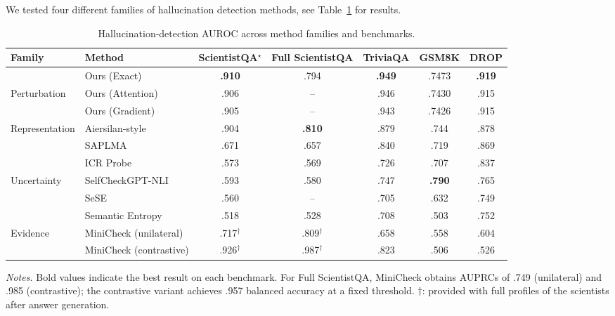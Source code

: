We tested four different families of hallucination detection methods, see Table~\ref{tab:detection-auroc} for results. 

\begin{table}[t]
\centering
\caption{Hallucination-detection AUROC across method families and benchmarks.}
\label{tab:detection-auroc}
\small
\setlength{\tabcolsep}{4pt}
\begin{tabular}{llccccc}
\toprule
Family & Method & ScientistQA$^\star$ & Full ScientistQA & TriviaQA & GSM8K & DROP \\
\midrule
& Ours (Exact) & \textbf{.910} & .794 & \textbf{.949} & .7473 & \textbf{.919} \\
Perturbation
& Ours (Attention) & .906 & -- & .946 & .7430 & .915 \\
& Ours (Gradient) & .905 & -- & .943 & .7426 & .915 \\
\midrule
Representation
& Aiersilan-style & .904 & \textbf{.810} & .879 & .744 & .878 \\
& SAPLMA & .671 & .657 & .840 & .719 & .869 \\
& ICR Probe & .573 & .569 & .726 & .707 & .837 \\
\midrule
Uncertainty
& SelfCheckGPT-NLI & .593 & .580 & .747 & \textbf{.790} & .765 \\
& SeSE & .560 & -- & .705 & .632 & .749 \\
& Semantic Entropy & .518 & .528 & .708 & .503 & .752 \\
\midrule
Evidence
& MiniCheck (unilateral) & .717$^\dagger$ & .809$^\dagger$ & .658 & .558 & .604 \\
& MiniCheck (contrastive) & .926$^\dagger$ & .987$^\dagger$ & .823 & .506 & .526 \\
\bottomrule
\end{tabular}

\vspace{2pt}
\begin{minipage}{0.9\linewidth}
\footnotesize
\textit{Notes.}
Bold values indicate the best result on each benchmark. For Full ScientistQA,
MiniCheck obtains AUPRCs of .749 (unilateral) and .985 (contrastive); the
contrastive variant achieves .957 balanced accuracy at a fixed threshold.
$\dagger$: provided with full profiles of the scientists after answer generation.
\end{minipage}
\end{table}

\iffalse
